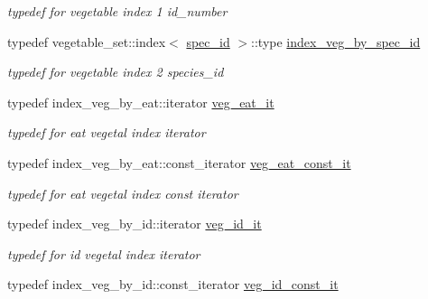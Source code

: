\begin{DoxyCompactItemize}
\begin{DoxyCompactList}\small\item\em typedef for vegetable index 1 id\_\-number \end{DoxyCompactList}\item 
\hypertarget{classSubsystemContainer_afce6013ad63346c39bc0d0c68e0933e6}{
typedef vegetable\_\-set::index$<$ \hyperlink{structSubsystemContainer_1_1spec__id}{spec\_\-id} $>$::type \hyperlink{classSubsystemContainer_afce6013ad63346c39bc0d0c68e0933e6}{index\_\-veg\_\-by\_\-spec\_\-id}}
\label{classSubsystemContainer_afce6013ad63346c39bc0d0c68e0933e6}

\begin{DoxyCompactList}\small\item\em typedef for vegetable index 2 species\_\-id \end{DoxyCompactList}\item 
\hypertarget{classSubsystemContainer_a561754a392ebbecb9360bedd2256d587}{
typedef index\_\-veg\_\-by\_\-eat::iterator \hyperlink{classSubsystemContainer_a561754a392ebbecb9360bedd2256d587}{veg\_\-eat\_\-it}}
\label{classSubsystemContainer_a561754a392ebbecb9360bedd2256d587}

\begin{DoxyCompactList}\small\item\em typedef for eat vegetal index iterator \end{DoxyCompactList}\item 
\hypertarget{classSubsystemContainer_a62dc5939b59c39c3b4fa5227205526af}{
typedef index\_\-veg\_\-by\_\-eat::const\_\-iterator \hyperlink{classSubsystemContainer_a62dc5939b59c39c3b4fa5227205526af}{veg\_\-eat\_\-const\_\-it}}
\label{classSubsystemContainer_a62dc5939b59c39c3b4fa5227205526af}

\begin{DoxyCompactList}\small\item\em typedef for eat vegetal index const iterator \end{DoxyCompactList}\item 
\hypertarget{classSubsystemContainer_a646e7cb7968fdb78105d62bb685aca81}{
typedef index\_\-veg\_\-by\_\-id::iterator \hyperlink{classSubsystemContainer_a646e7cb7968fdb78105d62bb685aca81}{veg\_\-id\_\-it}}
\label{classSubsystemContainer_a646e7cb7968fdb78105d62bb685aca81}

\begin{DoxyCompactList}\small\item\em typedef for id vegetal index iterator \end{DoxyCompactList}\item 
\hypertarget{classSubsystemContainer_aeb7fcecc573d61fcc41cdef2dd9df838}{
typedef index\_\-veg\_\-by\_\-id::const\_\-iterator \hyperlink{classSubsystemContainer_aeb7fcecc573d61fcc41cdef2dd9df838}{veg\_\-id\_\-const\_\-it}}
\label{classSubsystemContainer_aeb7fcecc573d61fcc41cdef2dd9df838}


\end{DoxyCompactItemize}

